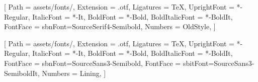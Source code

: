 %
%

\usepackage{fontspec}

\newcommand{\bookfontpath}{assets/fonts/}

%

\setmainfont{SourceSerif4}[
  Path = \bookfontpath,
  Extension = .otf,
  Ligatures = TeX,
  UprightFont = *-Regular,
  ItalicFont = *-It,
  BoldFont = *-Bold,
  BoldItalicFont = *-BoldIt,
  FontFace = {sb}{n}{Font=SourceSerif4-Semibold},
  Numbers = OldStyle,
]


%

\setsansfont{SourceSans3}[
  Path = \bookfontpath,
  Extension = .otf,
  Ligatures = TeX,
  UprightFont = *-Regular,
  ItalicFont = *-It,
  BoldFont = *-Bold,
  BoldItalicFont = *-BoldIt,
  FontFace = {sb}{n}{Font=SourceSans3-Semibold},
  FontFace = {sb}{it}{Font=SourceSans3-SemiboldIt},
  Numbers = Lining,
]

